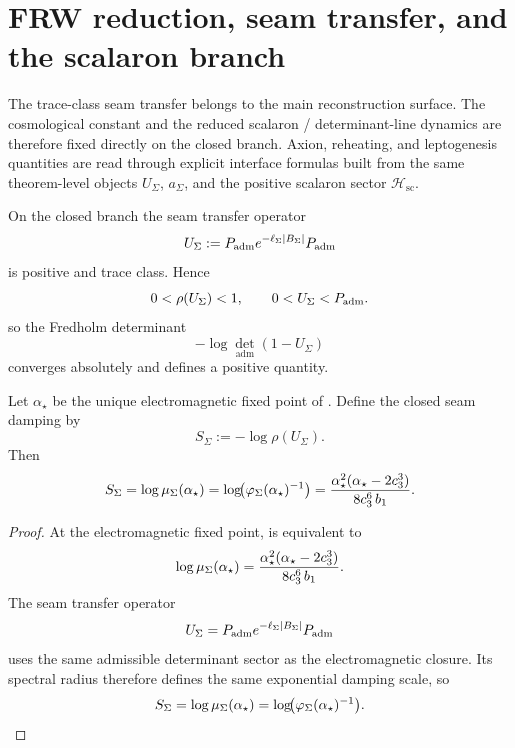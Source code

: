 
\section{FRW reduction, seam transfer, and the scalaron branch}
\label{sec:cosmology-closure}

The trace-class seam transfer belongs to the main reconstruction surface. The cosmological
constant and the reduced scalaron / determinant-line dynamics are therefore fixed directly on the
closed branch. Axion, reheating, and leptogenesis quantities are read through explicit interface
formulas built from the same theorem-level objects $U_\Sigma$, $a_\Sigma$, and the positive
scalaron sector $\mathcal H_{\mathrm{sc}}$.

\begin{theorem}
\label{lem:automatic-seam-transfer-convergence}
On the closed branch the seam transfer operator
\[
U_\Sigma:=P_{\mathrm{adm}} e^{-\ell_\Sigma|B_\Sigma|}P_{\mathrm{adm}}
\]
is positive and trace class. Hence
\[
0<\rho(U_\Sigma)<1,
\qquad
0<U_\Sigma<P_{\mathrm{adm}}.
\]
so the Fredholm determinant
\[
-\log\det_{\mathrm{adm}}(1-U_\Sigma)
\]
converges absolutely and defines a positive quantity.
\end{theorem}

\begin{proposition}
\label{prop:seam-action-cosmology}
Let $\alpha_\star$ be the unique electromagnetic fixed point of
. Define the closed seam damping by
\[
S_\Sigma:=-\log\rho(U_\Sigma).
\]
Then
\[
S_\Sigma
=
\log\mu_\Sigma(\alpha_\star)
=
\log\!\bigl(\varphi_{\Sigma}(\alpha_\star)^{-1}\bigr)
=
\frac{\alpha_\star^2(\alpha_\star-2c_3^3)}{8c_3^6\,b_1}.
\]
\end{proposition}

\begin{proof}
At the electromagnetic fixed point,  is equivalent to
\[
\log\mu_\Sigma(\alpha_\star)
=
\frac{\alpha_\star^2(\alpha_\star-2c_3^3)}{8c_3^6\,b_1}.
\]
The seam transfer operator
\[
U_\Sigma=P_{\mathrm{adm}} e^{-\ell_\Sigma|B_\Sigma|}P_{\mathrm{adm}}
\]
uses the same admissible determinant sector as the electromagnetic closure. Its spectral radius
therefore defines the same exponential damping scale, so
\[
S_\Sigma
=
\log\mu_\Sigma(\alpha_\star)
=
\log\!\bigl(\varphi_{\Sigma}(\alpha_\star)^{-1}\bigr).
\]
\end{proof}

